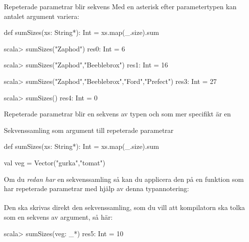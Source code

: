 


\begin{Slide}{Repeterade parametrar blir sekvens}\SlideFontSmall
Med en asterisk efter parametertypen kan antalet argument variera:
\begin{Code}[basicstyle=\fontsize{10}{12}\selectfont\ttfamily]
def sumSizes(xs: String*): Int = xs.map(_.size).sum
\end{Code}
\begin{REPLnonum}
scala> sumSizes("Zaphod")
res0: Int = 6

scala> sumSizes("Zaphod","Beeblebrox")
res1: Int = 16

scala> sumSizes("Zaphod","Beeblebrox","Ford","Prefect")
res3: Int = 27

scala> sumSizes()
res4: Int = 0
\end{REPLnonum}
Repeterade parametrar  blir en sekvens av typen  och som mer specifikt är en 
\end{Slide}


\begin{Slide}{Sekvenssamling som argument till repeterade parametrar}
\begin{Code}[basicstyle=\fontsize{10}{12}\selectfont\ttfamily]
def sumSizes(xs: String*): Int = xs.map(_.size).sum

val veg = Vector("gurka","tomat")
\end{Code}
Om du \emph{redan har} en sekvenssamling så kan du applicera den på en funktion
som har repeterade parametrar med hjälp av denna typannotering:\\
{\vspace{0.5em}\Large\code{: _* }} \\
\vspace{1em}Den ska skrivas direkt  den sekvenssamling, som du vill att kompilatorn ska tolka som en sekvens av argument, så här:
\begin{REPLnonum}
scala> sumSizes(veg: _*)
res5: Int = 10
\end{REPLnonum}

\end{Slide}
